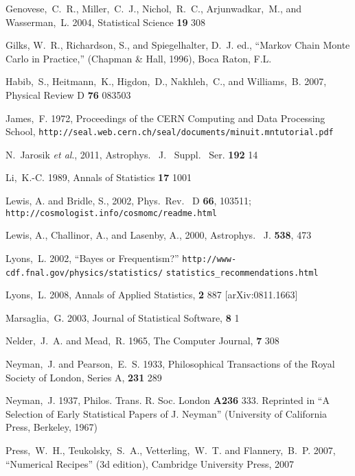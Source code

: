 \documentclass[useAMS,usenatbib]{aastex}
\begin{document}
\begin{thebibliography}{99}
Genovese,~C.~R., Miller,~C.~J., Nichol,~R.~C., Arjunwadkar,~M., and
Wasserman,~L. 2004, Statistical Science {\bf 19} 308

Gilks, W.~R., Richardson, S., and Spiegelhalter, D.~J. ed.,
``Markov Chain Monte Carlo in Practice,'' (Chapman \& Hall, 1996),
Boca Raton, F.L.

Habib,~S., Heitmann,~K., Higdon,~D., Nakhleh,~C., and
Williams,~B. 2007, Physical Review D {\bf 76} 083503

James,~F. 1972, Proceedings of the CERN Computing and Data Processing School,
\verb|http://seal.web.cern.ch/seal/documents/minuit.mntutorial.pdf|

N.~Jarosik {\it et al}., 2011, Astrophys. \ J. \ Suppl. \ Ser. {\bf 192} 14

Li,~K.-C. 1989, Annals of Statistics {\bf 17} 1001

Lewis, A. and Bridle, S., 2002, Phys.\ Rev. \ D {\bf 66}, 103511;
\verb|http://cosmologist.info/cosmomc/readme.html|

Lewis, A., Challinor, A., and Lasenby, A., 2000, 
Astrophys. \ J. {\bf 538}, 473

Lyons,~L. 2002, ``Bayes or Frequentism?''
\verb|http://www-cdf.fnal.gov/physics/statistics/|
\verb|statistics_recommendations.html|

Lyons,~L. 2008, Annals of Applied Statistics, {\bf 2} 887
[arXiv:0811.1663]

Marsaglia,~G. 2003, Journal of Statistical Software, {\bf 8} 1

Nelder,~J.~A. and Mead,~R. 1965, The Computer Journal, {\bf 7} 308

Neyman,~J. and Pearson,~E.~S. 1933, Philosophical Transactions
of the Royal Society of London, Series A, {\bf 231} 289

Neyman,~J. 1937, Philos. Trans. R. Soc. London {\bf A236} 333.
Reprinted in ``A Selection of Early Statistical Papers of J. Neyman''
(University of California Press, Berkeley, 1967)

Press,~W.~H., Teukolsky,~S.~A., Vetterling,~W.~T. and Flannery,~B.~P. 2007,
``Numerical Recipes'' (3d edition), Cambridge University Press, 2007


\end{thebibliography}
\end{document}
